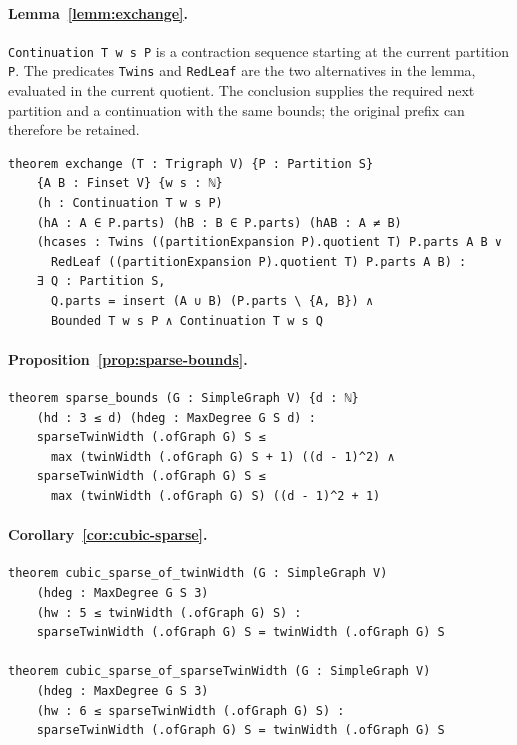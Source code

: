 \noindent\begin{minipage}{\linewidth}
\paragraph*{Lemma~\ref{lemm:exchange}.}
\lstinline|Continuation T w s P| is a contraction sequence starting at
the current partition \lstinline|P|. The predicates \lstinline|Twins|
and \lstinline|RedLeaf| are the two alternatives in the lemma, evaluated
in the current quotient. The conclusion supplies the required next
partition and a continuation with the same bounds; the original prefix
can therefore be retained.
\begin{lstlisting}
theorem exchange (T : Trigraph V) {P : Partition S}
    {A B : Finset V} {w s : ℕ}
    (h : Continuation T w s P)
    (hA : A ∈ P.parts) (hB : B ∈ P.parts) (hAB : A ≠ B)
    (hcases : Twins ((partitionExpansion P).quotient T) P.parts A B ∨
      RedLeaf ((partitionExpansion P).quotient T) P.parts A B) :
    ∃ Q : Partition S,
      Q.parts = insert (A ∪ B) (P.parts \ {A, B}) ∧
      Bounded T w s P ∧ Continuation T w s Q
\end{lstlisting}
\end{minipage}
\par\medskip
\noindent\begin{minipage}{\linewidth}
\paragraph*{Proposition~\ref{prop:sparse-bounds}.}
\begin{lstlisting}
theorem sparse_bounds (G : SimpleGraph V) {d : ℕ}
    (hd : 3 ≤ d) (hdeg : MaxDegree G S d) :
    sparseTwinWidth (.ofGraph G) S ≤
      max (twinWidth (.ofGraph G) S + 1) ((d - 1)^2) ∧
    sparseTwinWidth (.ofGraph G) S ≤
      max (twinWidth (.ofGraph G) S) ((d - 1)^2 + 1)
\end{lstlisting}
\end{minipage}
\par\medskip
\noindent\begin{minipage}{\linewidth}
\paragraph*{Corollary~\ref{cor:cubic-sparse}.}
\begin{lstlisting}
theorem cubic_sparse_of_twinWidth (G : SimpleGraph V)
    (hdeg : MaxDegree G S 3)
    (hw : 5 ≤ twinWidth (.ofGraph G) S) :
    sparseTwinWidth (.ofGraph G) S = twinWidth (.ofGraph G) S

theorem cubic_sparse_of_sparseTwinWidth (G : SimpleGraph V)
    (hdeg : MaxDegree G S 3)
    (hw : 6 ≤ sparseTwinWidth (.ofGraph G) S) :
    sparseTwinWidth (.ofGraph G) S = twinWidth (.ofGraph G) S
\end{lstlisting}
\end{minipage}

